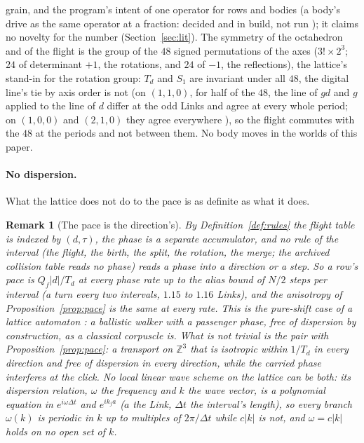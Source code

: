 \documentclass[11pt]{article}
\newtheorem{remark}{Remark}
\theoremstyle{definition}
\newcommand{\Z}{\mathbb{Z}}
\begin{document}
grain, and the program's intent of one operator for rows and bodies (a
body's drive as the same operator at a fraction: decided and in build,
not run \cite{log}); it claims no novelty for the number
(Section~\ref{sec:lit}). The symmetry of the octahedron and of the flight
is the group of the $48$ signed permutations of the axes ($3! \times 2^3$;
$24$ of determinant $+1$, the rotations, and $24$ of $-1$, the
reflections), the lattice's stand-in for the rotation group: $T_d$ and
$S_1$ are invariant under all $48$, the digital line's tie by axis order
is not (on $(1, 1, 0)$, for half of the $48$, the line of $gd$ and $g$
applied to the line of $d$ differ at the odd Links and agree at every
whole period; on $(1, 0, 0)$ and $(2, 1, 0)$ they agree everywhere
\cite{checks}), so the flight commutes with the $48$ at the periods and
not between them. No body moves in the worlds of this paper.

\paragraph{No dispersion.} What the lattice does not do to the pace is
as definite as what it does.

\begin{remark}[The pace is the direction's]\label{rem:nodispersion}
By Definition~\ref{def:rules} the flight table is indexed by $(d, \tau)$,
the phase is a separate accumulator, and no rule of the interval (the
flight, the birth, the split, the rotation, the merge; the archived
collision table reads no phase) reads a phase into a direction or a
step. So a row's pace
is $Q_f|d|/T_d$ at every phase rate up to the alias bound of $N/2$
steps per interval (a turn every two intervals, $1.15$ to $1.16$ Links),
and the anisotropy of Proposition~\ref{prop:pace} is the same at every
rate. This is the pure-shift case of a lattice automaton
\cite{meyer1996}: a ballistic walker with a passenger phase, free of
dispersion by construction, as a classical corpuscle is. What is not
trivial is the pair with Proposition~\ref{prop:pace}: a transport on
$\Z^3$ that is isotropic within $1/T_d$ in every direction and free of
dispersion in every direction, while the carried phase interferes at the
click. No local linear wave scheme on the lattice can be both: its
dispersion relation, $\omega$ the frequency and $k$ the wave vector, is
a polynomial equation in $e^{i\omega\Delta t}$ and $e^{ik_ja}$ ($a$ the
Link, $\Delta t$ the interval's length), so every branch $\omega(k)$ is
periodic in $k$ up to multiples of $2\pi/\Delta t$ while $c|k|$ is not,
and $\omega = c|k|$ holds on no open set of $k$.
\end{remark}
\end{document}
